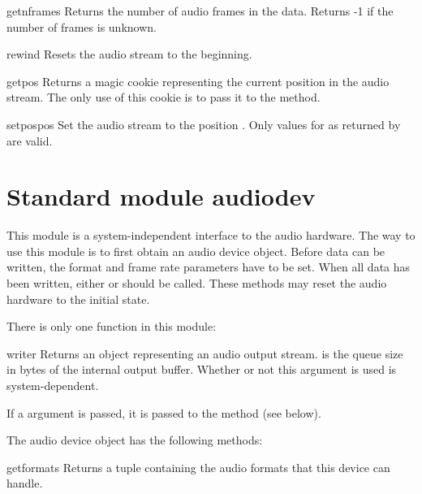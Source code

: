 \begin{funcdesc}{getnframes}{}
Returns the number of audio frames in the data.  Returns -1 if the
number of frames is unknown.
\end{funcdesc}

\begin{funcdesc}{rewind}{}
Resets the audio stream to the beginning.
\end{funcdesc}

\begin{funcdesc}{getpos}{}
Returns a magic cookie representing the current position in the audio
stream.  The only use of this cookie is to pass it to the
 method.
\end{funcdesc}

\begin{funcdesc}{setpos}{pos}
Set the audio stream to the position .  Only values for
 as returned by  are valid.
\end{funcdesc}

\section{Standard module audiodev}
\renewcommand{\indexsubitem}{(in module audiodev)}

This module is a system-independent interface to the audio hardware.
The way to use this module is to first obtain an audio device object.
Before data can be written, the format and frame rate parameters have
to be set.  When all data has been written, either  or
 should be called.  These methods may reset the audio
hardware to the initial state.

There is only one function in this module:

\begin{funcdesc}{writer}{}
Returns an object representing an audio output stream.   is
the queue size in bytes of the internal output buffer.  Whether or not
this argument is used is system-dependent.

If a  argument is passed, it is passed to the 
method (see below).
\end{funcdesc}

The audio device object has the following methods:
\renewcommand{\indexsubitem}{(audio device output object methods)}

\begin{funcdesc}{getformats}{}
Returns a tuple containing the audio formats that this device can
handle.
\end{funcdesc}


